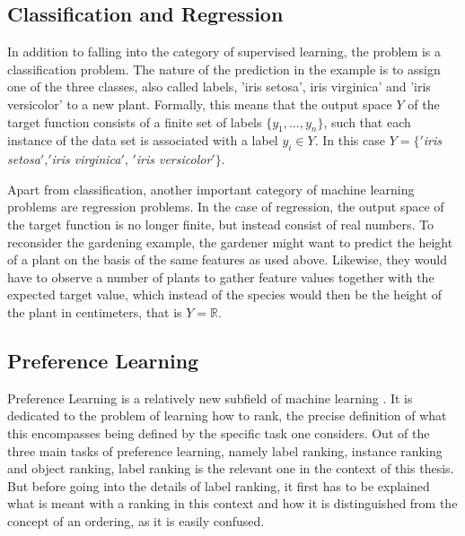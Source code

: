 \subsection{Classification and Regression}
In addition to falling into the category of supervised learning, the problem is a classification problem. The nature of the prediction in the example is to assign one of the three classes, also called labels, 'iris setosa', iris virginica' and 'iris versicolor' to a new plant. Formally, this means that the output space $Y$ of the target function consists of a finite set of labels $\lbrace y_1,\dots,y_n\rbrace$, such that each instance of the data set is associated with a label $y_i \in Y$. In this case $Y=\lbrace '$\textit{iris setosa}$'$,$'$\textit{iris virginica}$'$, $'$\textit{iris versicolor}$' \rbrace $. 

Apart from classification, another important category of machine learning problems are regression problems. In the case of regression, the output space of the target function is no longer finite, but instead consist of real numbers. To reconsider the gardening example, the gardener might want to predict the height of a plant on the basis of the same features as used above. Likewise, they would have to observe a number of plants to gather feature values together with the expected target value, which instead of the species would then be the height of the plant in centimeters, that is $Y=\mathbb{R}$.

\subsection{Preference Learning}
Preference Learning is a relatively new subfield of machine learning \cite{DBLP:books/daglib/0025729}. It is dedicated to the problem of learning how to rank, the precise definition of what this encompasses being defined by the specific task one considers. Out of the three main tasks of preference learning, namely label ranking, instance ranking and object ranking, label ranking is the relevant one in the context of this thesis. But before going into the details of label ranking, it first has to be explained what is meant with a ranking in this context and how it is distinguished from the concept of an ordering, as it is easily confused.

